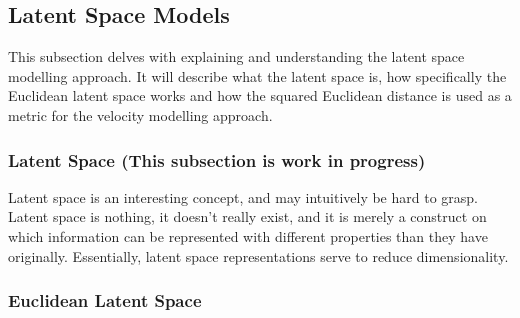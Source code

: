 
\subsection{Latent Space Models}
\label{sec:Method:LSM}
This subsection delves with explaining and understanding the latent space modelling approach.
It will describe what the latent space is, how specifically the Euclidean latent space works and how the squared Euclidean distance is used as a metric for the velocity modelling approach.


\subsubsection{Latent Space (This subsection is work in progress)}
\label{sec:Method:LSM:LatentSpace}

Latent space is an interesting concept, and may intuitively be hard to grasp.
Latent space is nothing, it doesn't really exist, and it is merely a construct on which information can be represented with different properties than they have originally.
Essentially, latent space representations serve to reduce dimensionality.
\\



\subsubsection{Euclidean Latent Space}
\label{sec:Method:LSM:EuclideanLatentSpace}

